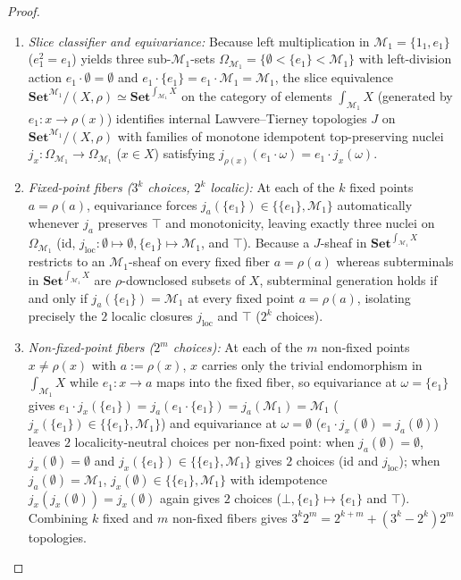 \documentclass[10pt,twoside,openright]{book}
\theoremstyle{crmplain}
\theoremstyle{crmdef}
\theoremstyle{crmremark}
\begin{document}
\begin{proof}
\begin{enumerate}[label=(\alph*),leftmargin=1.6em,noitemsep,topsep=2pt]
  \item \emph{Slice classifier and equivariance:} Because left multiplication in $\mathcal{M}_1 = \{1_1, e_1\}$ ($e_1^2 = e_1$) yields three sub-$\mathcal{M}_1$-sets $\Omega_{\mathcal{M}_1} = \{\emptyset < \{e_1\} < \mathcal{M}_1\}$ with left-division action $e_1 \cdot \emptyset = \emptyset$ and $e_1 \cdot \{e_1\} = e_1 \cdot \mathcal{M}_1 = \mathcal{M}_1$, the slice equivalence $\mathbf{Set}^{\mathcal{M}_1}/(X, \rho) \simeq \mathbf{Set}^{\int_{\mathcal{M}_1} X}$ on the category of elements $\int_{\mathcal{M}_1} X$ (generated by $e_1 : x \to \rho(x)$) identifies internal Lawvere--Tierney topologies $J$ on $\mathbf{Set}^{\mathcal{M}_1}/(X, \rho)$ with families of monotone idempotent top-preserving nuclei $j_x : \Omega_{\mathcal{M}_1} \to \Omega_{\mathcal{M}_1}$ ($x \in X$) satisfying $j_{\rho(x)}(e_1 \cdot \omega) = e_1 \cdot j_x(\omega)$.
  \item \emph{Fixed-point fibers ($3^k$ choices, $2^k$ localic):} At each of the $k$ fixed points $a = \rho(a)$, equivariance forces $j_a(\{e_1\}) \in \{\{e_1\}, \mathcal{M}_1\}$ automatically whenever $j_a$ preserves $\top$ and monotonicity, leaving exactly three nuclei on $\Omega_{\mathcal{M}_1}$ ($\mathrm{id}$, $j_{\mathrm{loc}} : \emptyset \mapsto \emptyset, \{e_1\} \mapsto \mathcal{M}_1$, and $\top$). Because a $J$-sheaf in $\mathbf{Set}^{\int_{\mathcal{M}_1} X}$ restricts to an $\mathcal{M}_1$-sheaf on every fixed fiber $a = \rho(a)$ whereas subterminals in $\mathbf{Set}^{\int_{\mathcal{M}_1} X}$ are $\rho$-downclosed subsets of $X$, subterminal generation holds if and only if $j_a(\{e_1\}) = \mathcal{M}_1$ at every fixed point $a = \rho(a)$, isolating precisely the $2$ localic closures $j_{\mathrm{loc}}$ and $\top$ ($2^k$ choices).
  \item \emph{Non-fixed-point fibers ($2^m$ choices):} At each of the $m$ non-fixed points $x \neq \rho(x)$ with $a := \rho(x)$, $x$ carries only the trivial endomorphism in $\int_{\mathcal{M}_1} X$ while $e_1 : x \to a$ maps into the fixed fiber, so equivariance at $\omega = \{e_1\}$ gives $e_1 \cdot j_x(\{e_1\}) = j_a(e_1 \cdot \{e_1\}) = j_a(\mathcal{M}_1) = \mathcal{M}_1$ ($j_x(\{e_1\}) \in \{\{e_1\}, \mathcal{M}_1\}$) and equivariance at $\omega = \emptyset$ ($e_1 \cdot j_x(\emptyset) = j_a(\emptyset)$) leaves $2$ localicity-neutral choices per non-fixed point: when $j_a(\emptyset) = \emptyset$, $j_x(\emptyset) = \emptyset$ and $j_x(\{e_1\}) \in \{\{e_1\}, \mathcal{M}_1\}$ gives $2$ choices ($\mathrm{id}$ and $j_{\mathrm{loc}}$); when $j_a(\emptyset) = \mathcal{M}_1$, $j_x(\emptyset) \in \{\{e_1\}, \mathcal{M}_1\}$ with idempotence $j_x(j_x(\emptyset)) = j_x(\emptyset)$ again gives $2$ choices ($\bot, \{e_1\} \mapsto \{e_1\}$ and $\top$). Combining $k$ fixed and $m$ non-fixed fibers gives $3^k 2^m = 2^{k+m} + (3^k - 2^k) 2^m$ topologies.
\end{enumerate}\qedhere
\end{proof}
\end{document}
